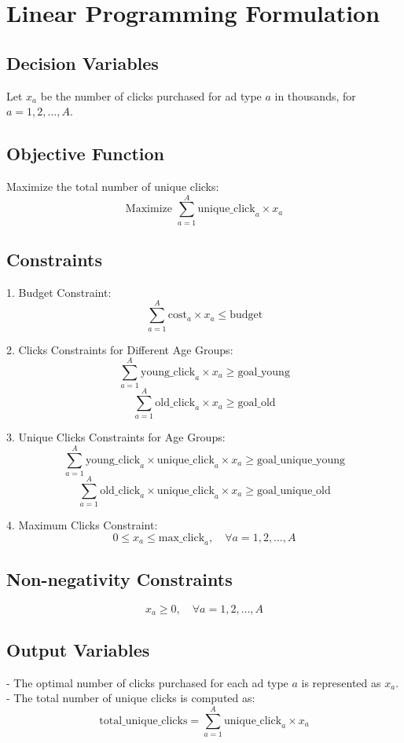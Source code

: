 \documentclass{article}
\begin{document}
\section*{Linear Programming Formulation}

\subsection*{Decision Variables}
Let \( x_a \) be the number of clicks purchased for ad type \( a \) in thousands, for \( a = 1, 2, \ldots, A \).

\subsection*{Objective Function}
Maximize the total number of unique clicks:
\[
\text{Maximize } \sum_{a=1}^{A} \text{unique\_click}_{a} \times x_a
\]

\subsection*{Constraints}
1. Budget Constraint:
\[
\sum_{a=1}^{A} \text{cost}_{a} \times x_a \leq \text{budget}
\]

2. Clicks Constraints for Different Age Groups:
\[
\sum_{a=1}^{A} \text{young\_click}_{a} \times x_a \geq \text{goal\_young}
\]
\[
\sum_{a=1}^{A} \text{old\_click}_{a} \times x_a \geq \text{goal\_old}
\]

3. Unique Clicks Constraints for Age Groups:
\[
\sum_{a=1}^{A} \text{young\_click}_{a} \times \text{unique\_click}_{a} \times x_a \geq \text{goal\_unique\_young}
\]
\[
\sum_{a=1}^{A} \text{old\_click}_{a} \times \text{unique\_click}_{a} \times x_a \geq \text{goal\_unique\_old}
\]

4. Maximum Clicks Constraint:
\[
0 \leq x_a \leq \text{max\_click}_{a}, \quad \forall a = 1, 2, \ldots, A
\]

\subsection*{Non-negativity Constraints}
\[
x_a \geq 0, \quad \forall a = 1, 2, \ldots, A
\]

\subsection*{Output Variables}
- The optimal number of clicks purchased for each ad type \( a \) is represented as \( x_a \).
- The total number of unique clicks is computed as: 
  \[
  \text{total\_unique\_clicks} = \sum_{a=1}^{A} \text{unique\_click}_{a} \times x_a
  \]
\end{document}
